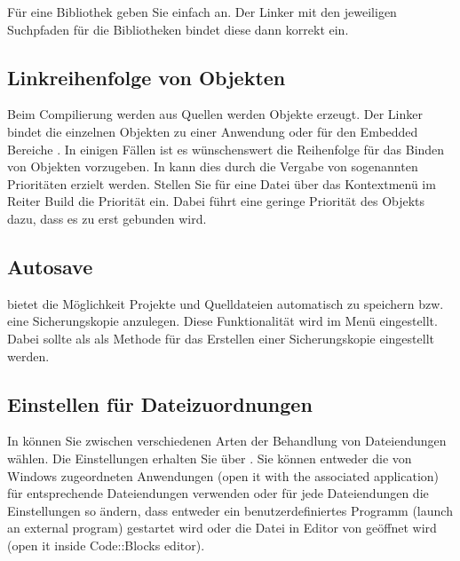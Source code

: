
Für eine Bibliothek  geben Sie einfach  an. Der Linker mit den jeweiligen Suchpfaden für die Bibliotheken bindet diese dann korrekt ein.


\subsection{Linkreihenfolge von Objekten}

Beim Compilierung werden aus Quellen  werden Objekte  erzeugt. Der Linker bindet die einzelnen Objekten zu einer Anwendung  oder für den Embedded Bereiche . In einigen Fällen ist es wünschenswert die Reihenfolge für das Binden von Objekten vorzugeben. In \codeblocks kann dies durch die Vergabe von sogenannten Prioritäten erzielt werden. Stellen Sie für eine Datei über das Kontextmenü  im Reiter Build die Priorität ein. Dabei führt eine geringe Priorität des Objekts dazu, dass es zu erst gebunden wird.

\subsection{Autosave}

\codeblocks bietet die Möglichkeit Projekte und Quelldateien automatisch zu speichern bzw. eine Sicherungskopie anzulegen. Diese Funktionalität wird im Menü  eingestellt. Dabei sollte als  als Methode für das Erstellen einer Sicherungskopie eingestellt werden.

\subsection{Einstellen für Dateizuordnungen}\label{sec:file_extension}

In \codeblocks können Sie zwischen verschiedenen Arten der Behandlung von Dateiendungen wählen.  Die Einstellungen erhalten Sie über .
Sie können entweder die von Windows zugeordneten Anwendungen (open it with the associated application) für entsprechende Dateiendungen verwenden oder für jede Dateiendungen die Einstellungen so ändern, dass entweder ein benutzerdefiniertes Programm (launch an external program) gestartet wird oder die Datei in Editor von \codeblocks geöffnet wird (open it inside Code::Blocks editor).

